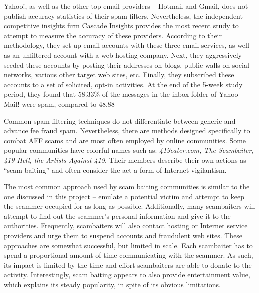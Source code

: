 Yahoo!, as well as the other top email providers -- Hotmail and Gmail, does not publish accuracy statistics of their spam filters. Nevertheless, the independent competitive insights firm Cascade Insights provides the most recent study to attempt to measure the accuracy of these providers. According to their methodology, they set up email accounts with these three email services, as well as an unfiltered account with a web hosting company. Next, they aggressively seeded these accounts by posting their addresses on blogs, public walls on social networks, various other target web sites, etc. Finally, they subscribed these accounts to a set of solicited, opt-in activities. At the end of the 5-week study period, they found that 58.33\% of the messages in the inbox folder of Yahoo Mail! were spam, compared to 48.88%

Common spam filtering techniques do not differentiate between generic and advance fee fraud spam. Nevertheless, there are methods designed specifically to combat AFF scams and are most often employed by online communities. Some popular communities have colorful names such as: \textit{419eater.com, The Scambaiter, 419 Hell, the Artists Against 419}. Their members describe their own actions as ``scam baiting'' and often consider the act a form of Internet vigilantism. 

The most common approach used by scam baiting communities is similar to the one discussed in this project -- emulate a potential victim and attempt to keep the scammer occupied for as long as possible. Additionally, many scambaiters will attempt to find out the scammer's personal information and give it to the authorities. Frequently, scambaiters will also contact hosting or Internet service providers and urge them to suspend accounts and fraudulent web sites. These approaches are somewhat successful, but limited in scale. Each scambaiter has to spend a proportional amount of time communicating with the scammer. As such, its impact is limited by the time and effort scambaiters are able to donate to the activity. Interestingly, scam baiting appears to also provide entertainment value, which explains its steady popularity, in spite of its obvious limitations.

